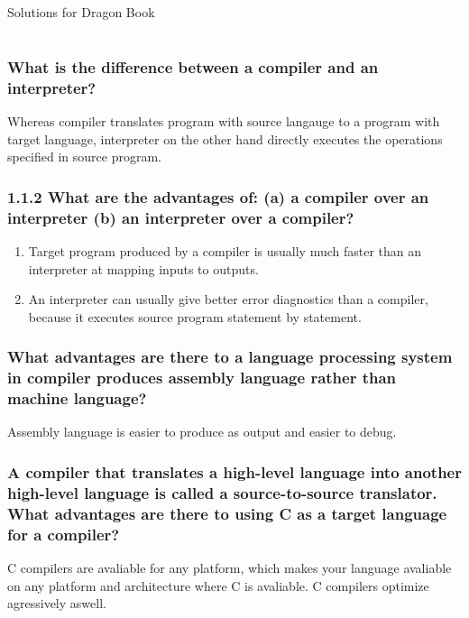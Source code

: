 \documentclass[12pt,a4paper,oneside,draft]{report}
\begin{document}
\titleformat{\chapter}[display] %
{\normalfont\bfseries}{}{0pt}{\Large}

\begin{center}
	Solutions for Dragon Book
\end{center}

\chapter{}
\section{}
\subsection{What is the difference between a compiler and an interpreter?}
Whereas compiler translates program with source langauge to a program with target language, 
interpreter on the other hand directly executes the operations specified in source program.

\subsection{1.1.2 What are the advantages of: (a) a compiler over an interpreter 
(b) an interpreter over a compiler?}
\begin{enumerate}[label=(\alph*)]
	\item Target program produced by a compiler is usually 
	much faster than an interpreter at mapping inputs to outputs.
	\item An interpreter can usually give better error diagnostics than a compiler, 
	because it executes source program statement by statement.
\end{enumerate}

\subsection{What advantages are there to a language processing system in compiler 
produces assembly language rather than machine language?}
Assembly language is easier to produce as output and easier to debug.

\subsection{A compiler that translates a high-level language into another high-level 
language is called a source-to-source translator. What advantages are there to 
using C as a target language for a compiler?}
C compilers are avaliable for any platform, which makes your 
language avaliable on any platform and architecture where C is avaliable. 
C compilers optimize agressively aswell.
\end{document}
